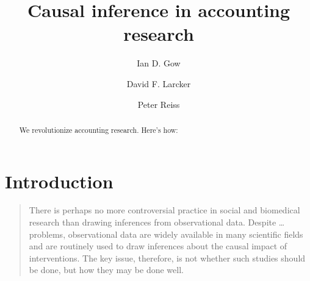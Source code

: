 \documentclass[11pt]{amsart}
\title[Causal inference]{Causal inference in accounting research}
\author{Ian D. Gow \and David F. Larcker \and Peter Reiss}
\begin{document}
\usetikzlibrary{automata, shapes, calc, positioning}



\maketitle

\begin{abstract}
	We revolutionize accounting research. Here's how:
\end{abstract}


\clearpage

 
\section{Introduction}

\begin{quotation}
	There is perhaps no more controversial practice in social and biomedical research than drawing inferences from observational data.
	Despite \dots problems, observational data are widely available in many scientific fields and are routinely used to draw inferences about the causal impact of interventions.
	The key issue, therefore, is not whether such studies should be done, but how they may be done well.
\end{quotation}
\end{document}
